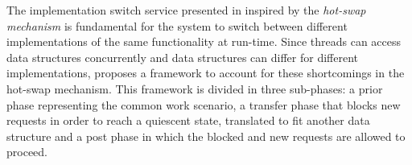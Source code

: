 The implementation switch service presented in \cite{selfaware} inspired by the \emph{hot-swap mechanism} is fundamental for the system to switch between different implementations of the same functionality at run-time. Since threads can access data structures concurrently and data structures can differ for different implementations, \cite{selfaware} proposes a framework to account for these shortcomings in the hot-swap mechanism.  This framework is divided in three sub-phases: a prior phase representing the common work scenario, a transfer phase that blocks new requests in order to reach a quiescent state, translated to fit another data structure and a post phase in which the blocked and new requests are allowed to proceed. 
%
%
